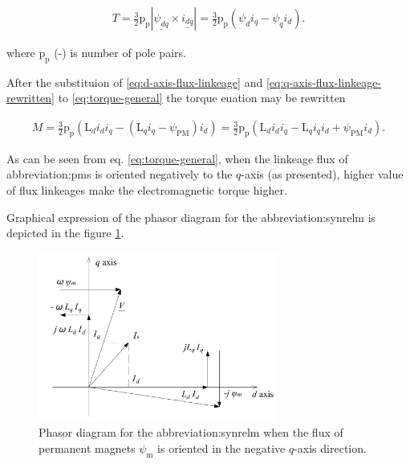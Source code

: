 \documentclass[a4paper, twoside, 11pt]{article}
\begin{document}
        \begin{equation}\label{eq:torque-general}
            \begin{gathered}
                T = \frac{3}{2} \text{p}_\text{p} | \underline{\psi_{dq}} \times \underline{i_{dq}} | = \frac{3}{2} \text{p}_\text{p} (\psi_d i_q - \psi_q i_d).
            \end{gathered}
        \end{equation}

        where $\text{p}_\text{p}$ (-) is number of pole pairs.\par

        After the substituion of \ref{eq:d-axis-flux-linkeage} and \ref{eq:q-axis-flux-linkeage-rewritten} to \ref{eq:torque-general} the torque euation may be rewritten


        \begin{equation}\label{eq:torque-pmsynrelm}
            \begin{gathered}
                M = \frac{3}{2} \text{p}_\text{p} (\text{L}_d i_d i_q - (\text{L}_q i_q -\psi_\text{PM}) i_d) = \frac{3}{2} \text{p}_\text{p} (\text{L}_d i_d i_q - \text{L}_q i_q i_d + \psi_\text{PM} i_d).
            \end{gathered}
        \end{equation}

        \par
        As can be seen from eq. \ref{eq:torque-general}, when the linkeage flux of \gls{abbreviation:pm}s is oriented negatively to the $q$-axis (as presented), higher value of flux linkeages make the electromagnetic torque higher.\par
        
        Graphical expression of the phasor diagram for the \gls{abbreviation:synrelm} is depicted in the figure \ref{fig:cad-pmasynrm-vector-diagram}.
        
        \begin{figure}[htbp!]
            \centering
            \includegraphics[width=0.70\textwidth]{src/pdf/cad-pmasynrm-vector-diagram.pdf}
            \caption{Phasor diagram for the \gls{abbreviation:synrelm} when the flux of permanent magnets $\psi_\text{m}$ is oriented in the negative $q$-axis direction.}
            \label{fig:cad-pmasynrm-vector-diagram}
        \end{figure}
    
\end{document}
